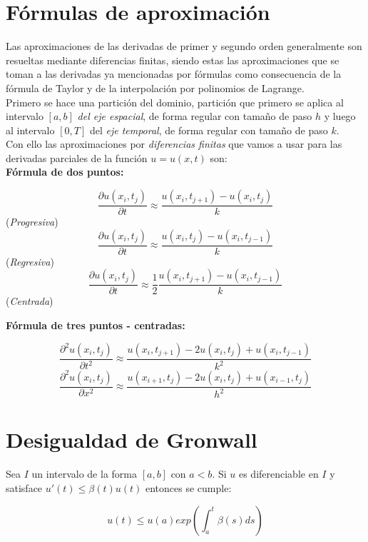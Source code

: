 \section*{Fórmulas de aproximación}

Las aproximaciones de las derivadas de primer y segundo orden generalmente son resueltas mediante diferencias finitas, siendo estas las aproximaciones que se toman a las derivadas ya mencionadas por fórmulas como consecuencia de la fórmula de Taylor y de la interpolación por polinomios de Lagrange.\\
	
		Primero se hace una partición del dominio, partición que primero se aplica al intervalo $\left[a,b\right]$ \textit{del eje espacial}, de forma regular con tamaño de paso $h$ y luego al  intervalo $\left[0,T\right]$ del \textit{eje temporal}, de forma regular con tamaño de paso $k$.\\
		
		Con ello las aproximaciones por \textit{diferencias finitas} que vamos a usar para las derivadas parciales de la función $u=u(x,t)$ son:\\
		
		\textbf{Fórmula de dos puntos:}
		\begin{center}
			$$\frac{ \partial u({ x }_{ i },{ t }_{ j }) }{ \partial t } \approx \frac { u({ x }_{ i },{ t }_{ j+1 })-u({ x }_{ i },{ t }_{ j }) }{ k }$$ (\textit{Progresiva})\\
			
			$$\frac{ \partial u({ x }_{ i },{ t }_{ j }) }{ \partial t } \approx \frac { u({ x }_{ i },{ t }_{ j })-u({ x }_{ i },{ t }_{ j-1 }) }{ k }$$ (\textit{Regresiva})\\
			
			$$\frac{ \partial u({ x }_{ i },{ t }_{ j }) }{ \partial t } \approx \frac{1}{2}\frac { u({ x }_{ i },{ t }_{ j+1 })-u({ x }_{ i },{ t }_{ j-1 }) }{ k }$$ (\textit{Centrada})
			
		\end{center}
	
		\par \textbf{Fórmula de tres puntos - centradas:}
		\begin{center}
			$$\frac{ \partial^2 u({ x }_{ i },{ t }_{ j }) }{ \partial t^2 } \approx \frac { u({ x }_{ i },{ t }_{ j+1 })-2u({ x }_{ i },{ t }_{ j }) + u({ x }_{ i },{ t }_{ j-1 })}{ k^2 }$$
			$$\frac{ \partial^2 u({ x }_{ i },{ t }_{ j }) }{ \partial x^2 } \approx \frac { u({ x }_{ i+1 },{ t }_{ j })-2u({ x }_{ i },{ t }_{ j }) + u({ x }_{ i-1 },{ t }_{ j })}{ h^2 }$$
		\end{center}
\section*{Desigualdad de Gronwall }

Sea $I$ un intervalo de la forma $[a,b]$ con $a<b$. Si $u$ es diferenciable en $I$ y satisface $u'(t)\leq \beta(t)u(t)$ entonces se cumple:

$$ u(t)\leq u(a)exp\left(\int_{a}^{t}\beta(s)ds\right)$$
